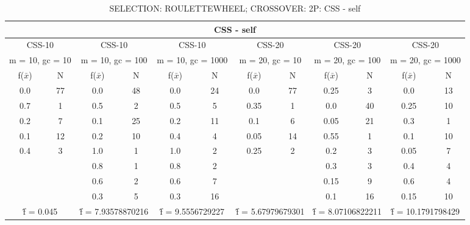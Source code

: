 \begin{table}[H]
	\centering
	\caption{SELECTION: ROULETTEWHEEL; CROSSOVER: 2P: CSS - self}
	\begin{adjustbox}{width=1\textwidth}
		\begin{tabular}{ |c|c||c|c||c|c||c|c||c|c||c|c| }
			\hline
			\multicolumn{12}{|c|}{CSS - self} \\
			\hline
			\multicolumn{2}{|c||}{CSS-10} & \multicolumn{2}{c||}{CSS-10} & \multicolumn{2}{c||}{CSS-10} & \multicolumn{2}{c||}{CSS-20} & \multicolumn{2}{c||}{CSS-20} & \multicolumn{2}{c|}{CSS-20}\\
			\hline
			\multicolumn{2}{|c||}{m = 10, gc = 10} & \multicolumn{2}{c||}{m = 10, gc = 100} & \multicolumn{2}{c||}{m = 10, gc = 1000} & \multicolumn{2}{c||}{m = 20, gc = 10} & \multicolumn{2}{c||}{m = 20, gc = 100} & \multicolumn{2}{c|}{m = 20, gc = 1000}\\
			\hline
			f($\bar{x}$) & N & f($\bar{x}$) & N & f($\bar{x}$) & N & f($\bar{x}$) & N & f($\bar{x}$) & N & f($\bar{x}$) & N\\
			\hline
			\hline
			0.0 & 77 & 0.0 & 48 & 0.0 & 24 & 0.0 & 77 & 0.25 & 3 & 0.0 & 13\\
			0.7 & 1 & 0.5 & 2 & 0.5 & 5 & 0.35 & 1 & 0.0 & 40 & 0.25 & 10\\
			0.2 & 7 & 0.1 & 25 & 0.2 & 11 & 0.1 & 6 & 0.05 & 21 & 0.3 & 1\\
			0.1 & 12 & 0.2 & 10 & 0.4 & 4 & 0.05 & 14 & 0.55 & 1 & 0.1 & 10\\
			0.4 & 3 & 1.0 & 1 & 1.0 & 2 & 0.25 & 2 & 0.2 & 3 & 0.05 & 7\\
			&   & 0.8 & 1 & 0.8 & 2 &   &   & 0.3 & 3 & 0.4 & 4\\
			&   & 0.6 & 2 & 0.6 & 7 &   &   & 0.15 & 9 & 0.6 & 4\\
			&   & 0.3 & 5 & 0.3 & 16 &   &   & 0.1 & 16 & 0.15 & 10\\
			\hline
			\multicolumn{2}{|c||}{\^{f} = 0.045} & \multicolumn{2}{c||}{\^{f} = 7.93578870216} & \multicolumn{2}{c||}{\^{f} = 9.5556729227} & \multicolumn{2}{c||}{\^{f} = 5.67979679301} & \multicolumn{2}{c||}{\^{f} = 8.07106822211} & \multicolumn{2}{c|}{\^{f} = 10.1791798429}\\
			\hline
		\end{tabular}
	\end{adjustbox}
\end{table}
